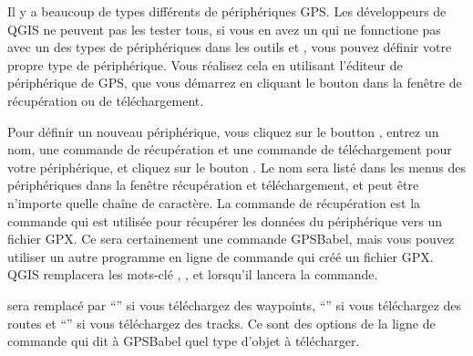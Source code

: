 Il y a beaucoup de types différents de périphériques GPS.
Les développeurs de QGIS ne peuvent pas les tester tous, si vous en avez un qui
ne fonnctione pas avec un des types de périphériques dans les outils
 et , vous pouvez définir votre
propre type de périphérique.
Vous réalisez cela en utilisant l'éditeur de périphérique de GPS, que vous
démarrez en cliquant le bouton  dans la fenêtre
de récupération ou de téléchargement.

Pour définir un nouveau périphérique, vous cliquez sur le boutton
, entrez un nom, une commande de récupération et
une commande de téléchargement pour votre périphérique, et cliquez sur le
bouton .
Le nom sera listé dans les menus des périphériques dans la fenêtre récupération
et téléchargement, et peut être n'importe quelle chaîne de caractère.
La commande de récupération est la commande qui est utilisée pour récupérer les
données du périphérique vers un fichier GPX.
Ce sera certainement une commande GPSBabel, mais vous pouvez utiliser un autre
programme en ligne de commande qui créé un fichier GPX.
QGIS remplacera les mots-clé , , et
 lorsqu'il lancera la commande.

 sera remplacé par {}``''  si vous téléchargez
des waypoints, {}``'' si vous téléchargez des routes et
{}``'' si vous téléchargez des tracks.
Ce sont des options de la ligne de commande qui dit à GPSBabel quel type
d'objet  à télécharger.

